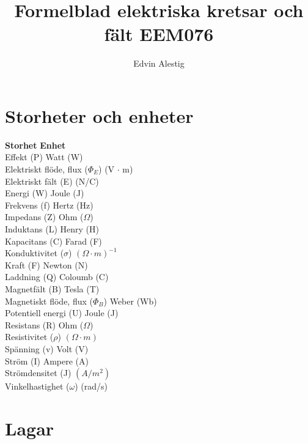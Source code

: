 \documentclass{article}
\title{Formelblad elektriska kretsar och fält EEM076}
\author{Edvin Alestig}
\begin{document}
\maketitle
\tableofcontents

\newpage
\section{Storheter och enheter}

\textbf{Storhet} \tab \textbf{Enhet}
\\
Effekt (P) \tab Watt (W)
\\
Elektriskt flöde, flux (\(\Phi_E\)) \tab (V \(\cdot\) m)
\\
Elektriskt fält (E) \tab (N/C)
\\
Energi (W) \tab Joule (J)
\\
Frekvens (f) \tab Hertz (Hz)
\\
Impedans (Z) \tab Ohm ($\Omega$)
\\
Induktans (L) \tab Henry (H)
\\
Kapacitans (C) \tab Farad (F)
\\
Konduktivitet (\(\sigma\)) \tab \( ( \Omega \cdot m )^{-1} \)
\\
Kraft (F) \tab Newton (N)
\\
Laddning (Q)  \tab Coloumb (C)
\\
Magnetfält (B) \tab Tesla (T)
\\
Magnetiskt flöde, flux (\(\Phi_B\)) \tab Weber (Wb)
\\
Potentiell energi (U) \tab Joule (J)
\\
Resistans (R) \tab Ohm ($\Omega$)
\\
Resistivitet (\(\rho\)) \tab \(( \Omega \cdot m )\)
\\
Spänning (v) \tab Volt (V)
\\
Ström (I) \tab Ampere (A)
\\
Strömdensitet (J) \tab \((A/m^2)\)
\\
Vinkelhastighet (\(\omega\)) \tab (rad/s)



\section{Lagar}
\end{document}
